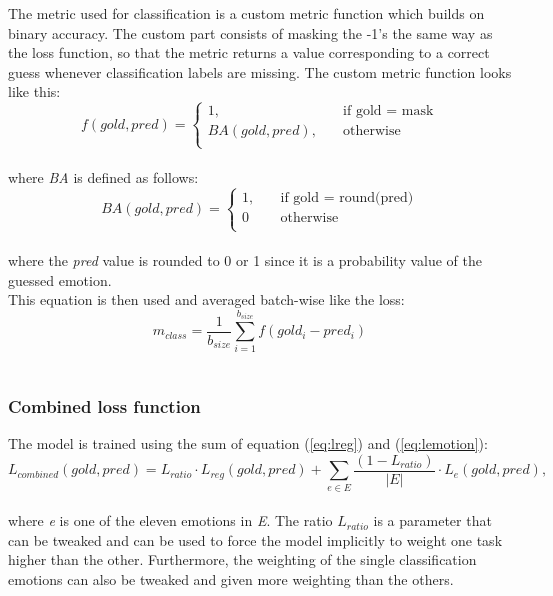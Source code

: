 The metric used for classification is a custom metric function which builds on binary accuracy. The custom part consists of masking the -1's the same way as the loss function, so that the metric returns a value corresponding to a correct guess whenever classification labels are missing. The custom metric function looks like this: \\
\begin{equation}
f(gold,pred) =
     \begin{cases}
       1, &\quad\text{if gold = mask}\\
       BA(gold,pred), &\quad\text{otherwise} \\
     \end{cases}
\end{equation}\\
where \textit{BA} is defined as follows: \\
\begin{equation} \label{eq:bin_acc}
BA(gold, pred) =
	\begin{cases}
		1, &\quad\text{if gold = round(pred)} \\
		0 &\quad\text{otherwise} \\
	\end{cases}
\end{equation}\\
where the \textit{pred} value is rounded to 0 or 1 since it is a probability value of the guessed emotion.\\
This equation is then used and averaged batch-wise like the loss: \\
\begin{equation} \label{eq:class_metric}
m_{class}=\dfrac{1}{b_{size}}\sum^{b_{size}}_{i=1}f\left(gold_{i}-pred_{i}\right)
\end{equation}\\

\subsubsection{Combined loss function}
The model is trained using the sum of equation (\ref{eq:lreg}) and (\ref{eq:lemotion}):\\
\begin{equation} \label{eq:lratio}
L_{combined}(gold,pred)=L_{ratio}\cdot L_{reg}(gold, pred) +  \sum_{e\in E}\dfrac{(1-L_{ratio})}{|E|}\cdot L_{e}(gold, pred),
\end{equation}\\
where \textit{e} is one of the eleven emotions in \textit{E}. The ratio $L_{ratio}$ is a parameter that can be tweaked and can be used to force the model implicitly to weight one task higher than the other. Furthermore, the weighting of the single classification emotions can also be tweaked and given more weighting than the others.

